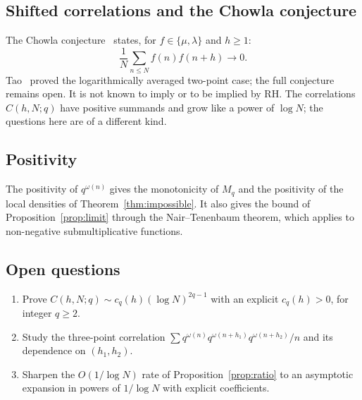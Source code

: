 \documentclass[11pt]{amsart}
\theoremstyle{definition}
\theoremstyle{remark}
\newcommand{\om}{\omega}
\begin{document}
\subsection{Shifted correlations and the Chowla conjecture}

The Chowla conjecture~\cite{C65} states, for $f\in\{\mu,\lambda\}$ and $h\ge1$:
\[
  \frac{1}{N}\sum_{n\le N} f(n)f(n+h) \to 0.
\]
Tao~\cite{T16} proved the logarithmically averaged two-point case; the full conjecture
remains open.  It is not known to imply or to be implied by RH.  The correlations
$C(h,N;q)$ have positive summands and grow like a power of $\log N$; the questions here are
of a different kind.

\subsection{Positivity}

The positivity of $q^{\om(n)}$ gives the monotonicity of $M_q$ and the positivity of the local
densities of Theorem~\ref{thm:impossible}.  It also gives the bound of
Proposition~\ref{prop:limit} through the Nair--Tenenbaum theorem, which applies to
non-negative submultiplicative functions.

\subsection{Open questions}

\begin{enumerate}
\item Prove $C(h,N;q)\sim c_q(h)(\log N)^{2q-1}$ with an explicit $c_q(h)>0$, for integer
  $q\ge2$.
\item \sloppy Study the three-point correlation
  $\sum q^{\om(n)}q^{\om(n+h_1)}q^{\om(n+h_2)}/n$ and its dependence on $(h_1,h_2)$.
\item Sharpen the $O(1/\log N)$ rate of Proposition~\ref{prop:ratio} to an asymptotic
  expansion in powers of $1/\log N$ with explicit coefficients.
\end{enumerate}
\end{document}
